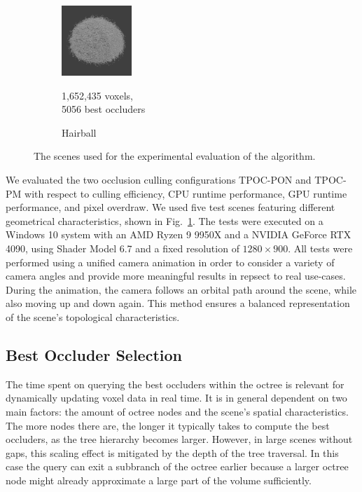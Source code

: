 \documentclass[conference]{IEEEtran}
\begin{document}
\begin{figure}
\begin{subfigure}{100px}
    \end{subfigure}
    \begin{subfigure}{100px}
        \includegraphics[width=100px]{images/model-hairball.jpg}
        \caption{Hairball \cite{b8}}
        \parbox{\linewidth}{\centering\footnotesize 1,652,435 voxels,\\ 5056 best occluders}
    \end{subfigure}
    
    \caption{The scenes used for the experimental evaluation of the algorithm.}
    \label{fig:models}
\end{figure}

\noindent
We evaluated the two occlusion culling configurations \ac{TPOC-PON} and \ac{TPOC-PM} with respect to culling 
efficiency, \ac{CPU} runtime performance, \ac{GPU} runtime performance, and pixel overdraw. We used five 
test scenes featuring different geometrical characteristics, shown in Fig.~\ref{fig:models}. The tests were 
executed on a Windows 10 system with an AMD Ryzen 9 9950X and a NVIDIA GeForce RTX 4090, using Shader Model 
6.7 and a fixed resolution of $1280 \times 900$. All tests were performed using a unified camera animation in 
order to consider a variety of camera angles and provide more meaningful results in repsect to real use-cases. 
During the animation, the camera follows an orbital path around the scene, while also moving up and down again. 
This method ensures a balanced representation of the scene's topological characteristics.


\subsection{Best Occluder Selection} \label{subsec-best-occluder-selection}

\noindent
The time spent on querying the best occluders within the octree is relevant for dynamically updating 
voxel data in real time. It is in general dependent on two main factors: the amount of octree nodes 
and the scene's spatial characteristics. \\

\noindent
The more nodes there are, the longer it typically takes to compute the best occluders, as the tree 
hierarchy becomes larger. However, in large scenes without gaps, this scaling effect is mitigated 
by the depth of the tree traversal. In this case the query can exit a subbranch of the octree 
earlier because a larger octree node might already approximate a large part of the volume sufficiently. \\
\end{document}
